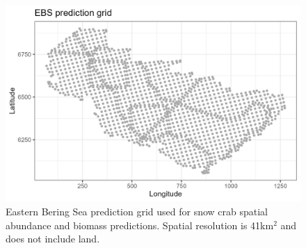 \documentclass[
]{article}
\begin{document}
\begin{figure}

{\centering \includegraphics[width=6in]{../SNOW/Figures/EBS_predgrid} 

}

\caption{Eastern Bering Sea prediction grid used for snow crab spatial abundance and biomass predictions. Spatial resolution is 41km$^2$ and does not include land.}\label{fig:snow-EBS-grid}
\end{figure}
\end{document}
